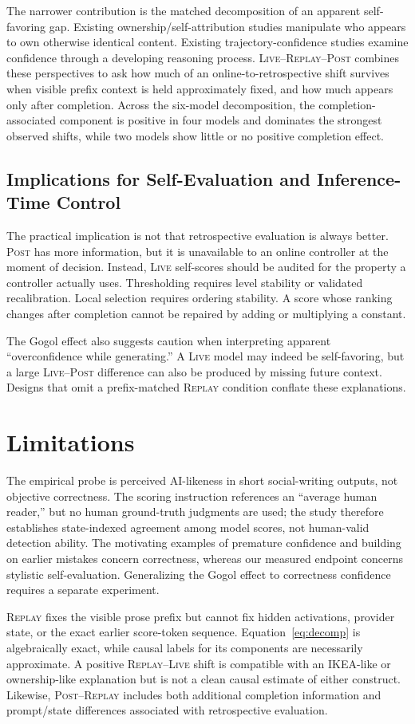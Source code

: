 \documentclass[10pt]{article}
\newcommand{\live}{\textsc{Live}}
\newcommand{\replay}{\textsc{Replay}}
\newcommand{\post}{\textsc{Post}}
\newcommand{\papersection}[1]{\Needspace{4.4\baselineskip}\section{#1}}
\newcommand{\papersubsection}[1]{\Needspace{3.8\baselineskip}\subsection{#1}}
\begin{document}
The narrower contribution is the matched decomposition of an apparent self-favoring gap. Existing ownership/self-attribution studies manipulate who appears to own otherwise identical content. Existing trajectory-confidence studies examine confidence through a developing reasoning process. \live{}--\replay{}--\post{} combines these perspectives to ask how much of an online-to-retrospective shift survives when visible prefix context is held approximately fixed, and how much appears only after completion. Across the six-model decomposition, the completion-associated component is positive in four models and dominates the strongest observed shifts, while two models show little or no positive completion effect.

\papersubsection{Implications for Self-Evaluation and Inference-Time Control}
The practical implication is not that retrospective evaluation is always better. \post{} has more information, but it is unavailable to an online controller at the moment of decision. Instead, \live{} self-scores should be audited for the property a controller actually uses. Thresholding requires level stability or validated recalibration. Local selection requires ordering stability. A score whose ranking changes after completion cannot be repaired by adding or multiplying a constant.

The Gogol effect also suggests caution when interpreting apparent ``overconfidence while generating.'' A \live{} model may indeed be self-favoring, but a large \live{}--\post{} difference can also be produced by missing future context. Designs that omit a prefix-matched \replay{} condition conflate these explanations.

\papersection{Limitations}
The empirical probe is perceived AI-likeness in short social-writing outputs, not objective correctness. The scoring instruction references an ``average human reader,'' but no human ground-truth judgments are used; the study therefore establishes state-indexed agreement among model scores, not human-valid detection ability. The motivating examples of premature confidence and building on earlier mistakes concern correctness, whereas our measured endpoint concerns stylistic self-evaluation. Generalizing the Gogol effect to correctness confidence requires a separate experiment.

\replay{} fixes the visible prose prefix but cannot fix hidden activations, provider state, or the exact earlier score-token sequence. Equation~\ref{eq:decomp} is algebraically exact, while causal labels for its components are necessarily approximate. A positive \replay{}--\live{} shift is compatible with an IKEA-like or ownership-like explanation but is not a clean causal estimate of either construct. Likewise, \post{}--\replay{} includes both additional completion information and prompt/state differences associated with retrospective evaluation.
\end{document}
